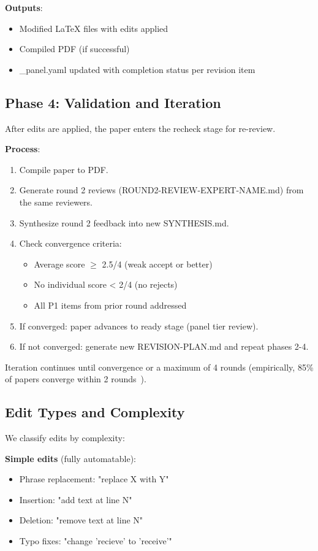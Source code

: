 \textbf{Outputs}:
\begin{itemize}
\item Modified LaTeX files with edits applied
\item Compiled PDF (if successful)
\item \_panel.yaml updated with completion status per revision item
\end{itemize}

\subsection{Phase 4: Validation and Iteration}

After edits are applied, the paper enters the recheck stage for re-review.

\textbf{Process}:
\begin{enumerate}
\item Compile paper to PDF.
\item Generate round 2 reviews (ROUND2-REVIEW-EXPERT-NAME.md) from the same reviewers.
\item Synthesize round 2 feedback into new SYNTHESIS.md.
\item Check convergence criteria:
  \begin{itemize}
  \item Average score $\geq$ 2.5/4 (weak accept or better)
  \item No individual score < 2/4 (no rejects)
  \item All P1 items from prior round addressed
  \end{itemize}
\item If converged: paper advances to ready stage (panel tier review).
\item If not converged: generate new REVISION-PLAN.md and repeat phases 2-4.
\end{enumerate}

Iteration continues until convergence or a maximum of 4 rounds (empirically, 85\% of papers converge within 2 rounds~\cite{dellalibera2026dynamics}).

\subsection{Edit Types and Complexity}

We classify edits by complexity:

\textbf{Simple edits} (fully automatable):
\begin{itemize}
\item Phrase replacement: "replace X with Y"
\item Insertion: "add text at line N"
\item Deletion: "remove text at line N"
\item Typo fixes: "change 'recieve' to 'receive'"
\end{itemize}

